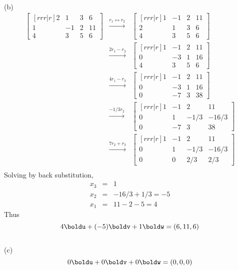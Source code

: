 \begin{solution}
$$$$
\ \\
(b) 
\begin{eqnarray*}
\begin{bmatrix}[rrr|r]
2&1&3&6\\
1&-1&2&11\\
4&3&5&6
\end{bmatrix}
&\xrightarrow[]{r_1 \leftrightarrow r_2}&
\begin{bmatrix}[rrr|r]
1&-1&2&11\\
2&1&3&6\\
4&3&5&6
\end{bmatrix}\\
&\xrightarrow[]{2r_1 - r_2}&
\begin{bmatrix}[rrr|r]
1&-1&2&11\\
0&-3&1&16\\
4&3&5&6
\end{bmatrix}\\
&\xrightarrow[]{4r_1 - r_3}&
\begin{bmatrix}[rrr|r]
1&-1&2&11\\
0&-3&1&16\\
0&-7&3&38
\end{bmatrix}\\
&\xrightarrow[]{-1/3r_2}&
\begin{bmatrix}[rrr|r]
1&-1&2&11\\
0&1&-1/3&-16/3\\
0&-7&3&38
\end{bmatrix}\\
&\xrightarrow[]{7r_2 + r_3}&
\begin{bmatrix}[rrr|r]
1&-1&2&11\\
0&1&-1/3&-16/3\\
0&0&2/3&2/3
\end{bmatrix}\\
\end{eqnarray*}
Solving by back substitution,
\begin{eqnarray*}
x_3 &=& 1\\
x_2 &=& -16/3 + 1/3 = -5\\
x_1 &=& 11 -2 -5 = 4
\end{eqnarray*}
Thus
$$
4\boldu + (-5)\boldv +1\boldw = (6,11,6)
$$
\ \\ (c) 
$$0\boldu + 0\boldv + 0\boldw = (0,0,0)$$
\end{solution}

